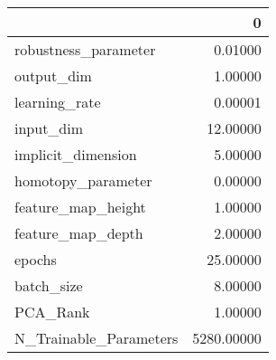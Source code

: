 \begin{tabular}{lr}
\toprule
{} &           0 \\
\midrule
robustness\_parameter   &     0.01000 \\
output\_dim             &     1.00000 \\
learning\_rate          &     0.00001 \\
input\_dim              &    12.00000 \\
implicit\_dimension     &     5.00000 \\
homotopy\_parameter     &     0.00000 \\
feature\_map\_height     &     1.00000 \\
feature\_map\_depth      &     2.00000 \\
epochs                 &    25.00000 \\
batch\_size             &     8.00000 \\
PCA\_Rank               &     1.00000 \\
N\_Trainable\_Parameters &  5280.00000 \\
\bottomrule
\end{tabular}
